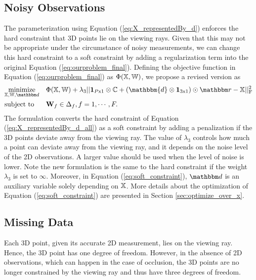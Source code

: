 \subsection{Noisy Observations} \label{sec:noisy_measure}
The parameterization using Equation (\ref{eq:X_representedBy_d}) enforces the hard constraint that 3D points lie on the viewing rays. 
Given that this may not be appropriate under the circumstance of noisy measurements, we can change this hard constraint to a soft constraint by adding a regularization term into the original Equation (\ref{eq:ourproblem_final}). Defining the objective function in Equation (\ref{eq:ourproblem_final}) as $\Phi(\mathbb X,\mathbb W)$, we propose a revised version as
\begin{equation}
\begin{aligned}
& \underset{\allX, \allT, \alld}{\text{minimize}} &&\Phi(\allX,\allT) + 
\lambda_3 ||\mathbf{1}_{P\text{x}1} \otimes \allC + (\mathbbm{d} \otimes \mathbf{1}_{3\text{x}1}) \odot \allr - \allX||_{\text{F}}^2 \\
 & \text{subject to} && \oneT_f \in \Delta_f, f=1,\cdots,F.
\end{aligned}
\label{eq:soft_constraint}
\end{equation}
The formulation converts the hard constraint of Equation (\ref{eq:X_representedBy_d_all}) as a soft constraint by adding a penalization if the 3D points deviate away from the viewing ray. The value of $\lambda_3$ controls how much a point can deviate away from the viewing ray, and it depends on the noise level of the 2D observations. A larger value should be used when the level of noise is lower. Note the new formulation is the same to the hard constraint if the weight $\lambda_3$ is set to $\infty$. Moreover, in Equation (\ref{eq:soft_constraint}), $\alld$ is an auxiliary variable solely depending on $\mathbb X$. More details about the optimization of Equation (\ref{eq:soft_constraint}) are presented in Section \ref{sec:optimize_over_x}.

\subsection{Missing Data} 
Each 3D point, given its accurate 2D measurement, lies on the viewing ray. Hence, the 3D point has one degree of freedom. However, in the absence of 2D observations, which can happen in the case of occlusion, the 3D points are no longer constrained by the viewing ray and thus have three degrees of freedom. 

